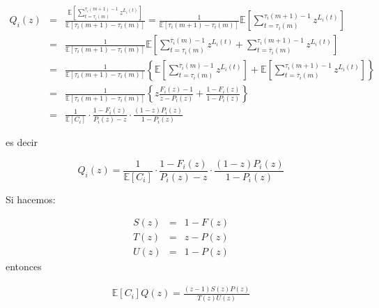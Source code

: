 \documentclass{article}
\newcommand{\esp}{\mathbb{E}}
\begin{document}
\begin{eqnarray*}
Q_{i}\left(z\right)&=&\frac{\esp\left[\sum_{t=\tau_{i}\left(m\right)}^{\tau_{i}\left(m+1\right)-1}z^{L_{i}\left(t\right)}\right]}{\esp\left[\tau_{i}\left(m+1\right)-\tau_{i}\left(m\right)\right]}
=\frac{1}{\esp\left[\tau_{i}\left(m+1\right)-\tau_{i}\left(m\right)\right]}
\esp\left[\sum_{t=\tau_{i}\left(m\right)}^{\tau_{i}\left(m+1\right)-1}z^{L_{i}\left(t\right)}\right]\\
&=&\frac{1}{\esp\left[\tau_{i}\left(m+1\right)-\tau_{i}\left(m\right)\right]}
\esp\left[\sum_{t=\tau_{i}\left(m\right)}^{\overline{\tau}_{i}\left(m\right)-1}z^{L_{i}\left(t\right)}
+\sum_{t=\overline{\tau}_{i}\left(m\right)}^{\tau_{i}\left(m+1\right)-1}z^{L_{i}\left(t\right)}\right]\\
&=&\frac{1}{\esp\left[\tau_{i}\left(m+1\right)-\tau_{i}\left(m\right)\right]}\left\{
\esp\left[\sum_{t=\tau_{i}\left(m\right)}^{\overline{\tau}_{i}\left(m\right)-1}z^{L_{i}\left(t\right)}\right]
+\esp\left[\sum_{t=\overline{\tau}_{i}\left(m\right)}^{\tau_{i}\left(m+1\right)-1}z^{L_{i}\left(t\right)}\right]\right\}\\
&=&\frac{1}{\esp\left[\tau_{i}\left(m+1\right)-\tau_{i}\left(m\right)\right]}\left\{
z\frac{F_{i}\left(z\right)-1}{z-P_{i}\left(z\right)}+\frac{1-F_{i}\left(z\right)}{1-P_{i}\left(z\right)}
\right\}\\
&=&\frac{1}{\esp\left[C_{i}\right]}\cdot\frac{1-F_{i}\left(z\right)}{P_{i}\left(z\right)-z}\cdot\frac{\left(1-z\right)P_{i}\left(z\right)}{1-P_{i}\left(z\right)}
\end{eqnarray*}

es decir

\begin{equation}
Q_{i}\left(z\right)=\frac{1}{\esp\left[C_{i}\right]}\cdot\frac{1-F_{i}\left(z\right)}{P_{i}\left(z\right)-z}\cdot\frac{\left(1-z\right)P_{i}\left(z\right)}{1-P_{i}\left(z\right)}
\end{equation}


Si hacemos:

\begin{eqnarray}
S\left(z\right)&=&1-F\left(z\right)\\
T\left(z\right)&=&z-P\left(z\right)\\
U\left(z\right)&=&1-P\left(z\right)
\end{eqnarray}
entonces 

\begin{eqnarray}
\esp\left[C_{i}\right]Q\left(z\right)=\frac{\left(z-1\right)S\left(z\right)P\left(z\right)}{T\left(z\right)U\left(z\right)}
\end{eqnarray}
\end{document}
